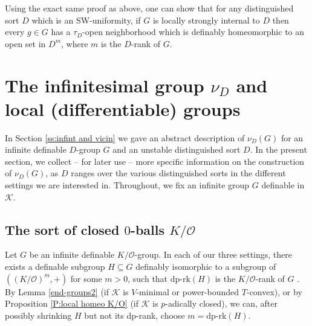 \documentclass[11pt]{amsart}
\theoremstyle{definition}
\newcommand{\CK}{{\mathcal K}}
\newcommand{\CO}{{\mathcal O}}
\newcommand{\0}{\emptyset}
\def\dpr{\mathrm{dp\text{-}rk}}
\begin{document}
Using the exact same proof as above, one can show that for any distinguished sort $D$ which is an SW-uniformity, if $G$ is locally strongly internal to $D$ then every $g\in G$ has a $\tau_D$-open neighborhood which is definably homeomorphic to an open set in $D^m$, where $m$ is the $D$-rank of $G$.






 
\section{The infinitesimal group $\nu_D$ and local (differentiable) groups}\label{S:infnit and local}

In Section \ref{ss:infint and vicin} we gave an abstract description of $\nu_D(G)$ for an infinite definable $D$-group  $G$ and  an unstable distinguished sort $D$. In the present section, we collect -- for later use -- more specific information on the construction of $\nu_D(G)$, as $D$ ranges over the various distinguished sorts in the different settings we are interested in. Throughout, we fix an infinite group $G$ definable in $\CK$. 


\subsection{The sort of closed $0$-balls $K/\CO$}\label{ss:nu in K/O}
Let $G$ be an infinite definable $K/\CO$-group. In each of our three settings, there exists a definable  subgroup $H\subseteq G$ definably isomorphic to a subgroup of $((K/\CO)^m,+)$ for some $m>0$, such that $\dpr(H)$ is the  $K/\CO$-rank of $G$ \cite[Theorems 7.4(4), 7.7(4), 7.11(3)]{HaHaPeGps}. By Lemma \ref{end-groups2} (if $\CK$ is $V$-minimal or power-bounded $T$-convex), or by Proposition \ref{P:local homeo K/O} (if $\CK$ is $p$-adically closed), we can, after possibly shrinking $H$  but not its dp-rank, choose $m=\dpr(H)$. 


\end{document}
